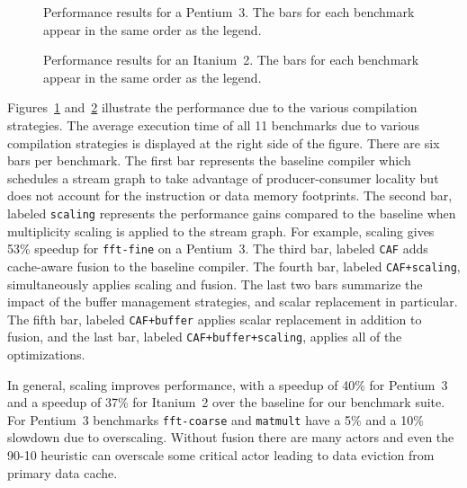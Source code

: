 

\begin{figure}[t]
  \vspace{-24pt}
  \hspace{-0.3in}
  \vspace{-48pt}
  \caption{Performance results for a Pentium~3.  The bars for each
  benchmark appear in the same order as the legend.}
  \label{fig:results-p3}
  \vspace{-6pt}
\end{figure}

\begin{figure}[t]
  \vspace{-36pt}
  \hspace{-0.3in}
  \vspace{-48pt}
  \caption{Performance results for an Itanium~2.  The bars for each
  benchmark appear in the same order as the legend.}
  \label{fig:results-ipf}
  \vspace{-12pt}
\end{figure}

Figures~\ref{fig:results-p3} and~\ref{fig:results-ipf} illustrate the
performance due to the various compilation strategies. The average 
execution time of all 11 benchmarks due to various compilation strategies 
is displayed at the right side of the figure. There are six bars per 
benchmark. The first bar represents the baseline compiler which
schedules a stream graph to take advantage of producer-consumer
locality but does not account for the instruction or data memory
footprints. The second bar, labeled {\tt scaling} represents the
performance gains compared to the baseline when multiplicity scaling
is applied to the stream graph. For example, scaling gives 53\%
speedup for \texttt{fft-fine} on a Pentium~3. The third bar, 
labeled {\tt CAF} adds cache-aware fusion to the baseline compiler. The fourth
bar, labeled \texttt{CAF+scaling}, simultaneously applies scaling and
fusion. The last two bars summarize the impact of the buffer
management strategies, and scalar replacement in particular. 
The fifth bar, labeled \texttt{CAF+buffer}
applies scalar replacement in addition to fusion, and the last bar,
labeled \texttt{CAF+buffer+scaling}, applies all of the optimizations.

In general, scaling improves performance, with a speedup of 
40\% for Pentium~3 and a speedup of 37\% for Itanium~2 over the baseline
for our benchmark suite. For Pentium~3 benchmarks \texttt{fft-coarse} and 
\texttt{matmult} have a 5\% and a 10\% slowdown due to overscaling. 
Without fusion there are many actors and even the 90-10 heuristic can 
overscale some critical actor leading to data eviction from primary 
data cache.

